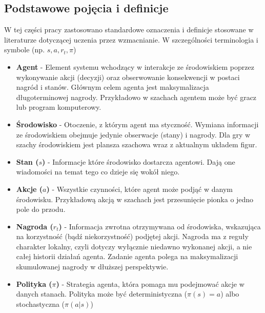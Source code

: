 \documentclass[a4paper, 12pt]{article}
\numberwithin{equation}{section}
\begin{document}
    \subsection{Podstawowe pojęcia i definicje}
    W tej części pracy zastosowano standardowe oznaczenia i definicje stosowane w literaturze dotyczącej uczenia przez wzmacnianie. 
    W szczególności terminologia i symbole (np. \( s, a, r_t, \pi \)) \cite{lapan2020deep}
    \begin{itemize}
        \item \textbf{Agent} - Element systemu wchodzący w interakcje ze środowiskiem poprzez wykonywanie akcji (decyzji) oraz obserwowanie konsekwencji w postaci nagród i stanów.
        Głównym celem agenta jest maksymalizacja długoterminowej nagrody. 
        Przykładowo w szachach agentem może być gracz lub program komputerowy.
        \item \textbf{Środowisko} - Otoczenie, z którym agent ma styczność. 
        Wymiana informacji ze środowiskiem obejmuje jedynie obserwacje (stany) i nagrody.
        Dla gry w szachy środowiskiem jest plansza szachowa wraz z aktualnym układem figur.
        \item \textbf{Stan (\( s \))} - Informacje które środowisko dostarcza agentowi. Dają one wiadomości na temat tego co dzieje się wokół niego.
        \item \textbf{Akcje (\( a \))} - Wszystkie czynności, które agent może podjąć w danym środowisku. 
        Przykładową akcją w szachach jest przesunięcie pionka o jedno pole do przodu.
        \item \textbf{Nagroda (\( r_t \))} - Informacja zwrotna otrzymywana od środowiska, wskazująca na korzystność (bądź niekorzystność) podjętej akcji. 
        Nagroda ma z reguły charakter lokalny, czyli dotyczy wyłącznie niedawno wykonanej akcji, a nie całej historii działań agenta. 
        Zadanie agenta polega na maksymalizacji skumulowanej nagrody w dłuższej perspektywie.
        \item \textbf{Polityka (\( \pi \))} - Strategia agenta, która pomaga mu podejmować akcje w danych stanach. Polityka może być deterministyczna
        (\( \pi(s) = a \)) albo stochastyczna (\( \pi(a|s) \))
    \end{itemize}
\end{document}

